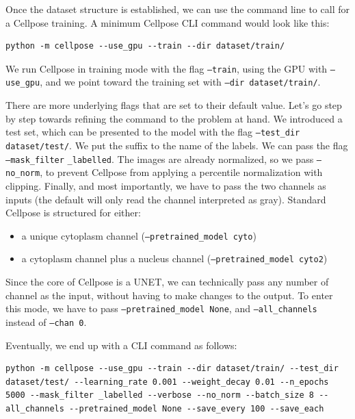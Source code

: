 \documentclass[tikz,10pt,a4paper]{article}
\begin{document}
	Once the dataset structure is established, we can use the command line to call for a Cellpose training. A minimum Cellpose CLI command would look like this: 

	\begin{verbatim}
python -m cellpose --use_gpu --train --dir dataset/train/
	\end{verbatim}
	
	We run Cellpose in training mode with the flag \texttt{--train}, using the GPU with \texttt{--use_gpu}, and we point toward the training set with \texttt{--dir dataset/train/}. 

	There are more underlying flags that are set to their default value. Let's go step by step towards refining the command to the problem at hand. We introduced a test set, which can be presented to the model with the flag \texttt{--test_dir dataset/test/}. 
	We put the  suffix to the name of the labels. We can pass the flag \texttt{--mask_filter} \texttt{_labelled}. The images are already normalized, so we pass \texttt{--no_norm}, to prevent Cellpose from applying a percentile normalization with clipping. Finally, and most importantly, we have to pass the two channels as inputs (the default will only read the channel interpreted as gray). Standard Cellpose is structured for either:
	\begin{itemize}
		\item a unique cytoplasm channel (\texttt{--pretrained_model cyto})
		\item a cytoplasm channel plus a nucleus channel (\texttt{--pretrained_model cyto2})
	\end{itemize}

	Since the core of Cellpose is a UNET, we can technically pass any number of channel as the input, without having to make changes to the output. To enter this mode, we have to pass \texttt{--pretrained_model None}, and \texttt{--all_channels} instead of \texttt{--chan 0}. 
	
	Eventually, we end up with a CLI command as follows:
	
	\begin{verbatim}
python -m cellpose --use_gpu --train --dir dataset/train/ --test_dir dataset/test/ --learning_rate 0.001 --weight_decay 0.01 --n_epochs 5000 --mask_filter _labelled --verbose --no_norm --batch_size 8 --all_channels --pretrained_model None --save_every 100 --save_each
	\end{verbatim}
	
\end{document}
